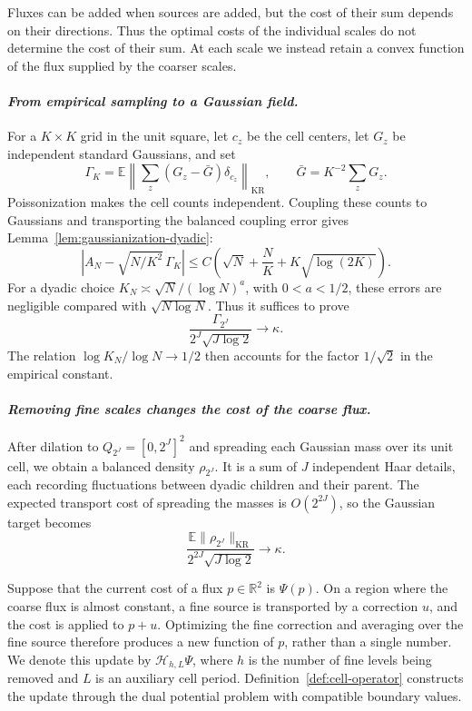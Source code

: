 \documentclass[11pt,reqno]{amsart}
\theoremstyle{plain}
\theoremstyle{definition}
\theoremstyle{remark}
\numberwithin{equation}{section}
\newcommand{\1}{\mathbf 1}
\newcommand{\KR}{\mathrm{KR}}
\begin{document}
Fluxes can be added when sources are added, but the cost of their sum
depends on their directions.  Thus the optimal costs of the individual
scales do not determine the cost of their sum.  At each scale we instead
retain a convex function of the flux supplied by the coarser scales.

\smallskip
\paragraph{\textit{From empirical sampling to a Gaussian field.}}
For a $K\times K$ grid in the unit square, let $c_z$ be the cell centers,
let $G_z$ be independent standard Gaussians, and set
\[
\Gamma_K=\mathbb E\left\|
\sum_z(G_z-\bar G)\delta_{c_z}\right\|_{\KR},
\qquad \bar G=K^{-2}\sum_zG_z.
\]
Poissonization makes the cell counts independent.  Coupling these counts
to Gaussians and transporting the balanced coupling error gives
Lemma~\ref{lem:gaussianization-dyadic}:
\[
\left|A_N-\sqrt{N/K^2}\,\Gamma_K\right|
\leq C\left(\sqrt N+\frac NK+K\sqrt{\log(2K)}\right).
\]
For a dyadic choice $K_N\asymp\sqrt N/(\log N)^a$, with $0<a<1/2$,
these errors are negligible compared with $\sqrt{N\log N}$.
Thus it suffices to prove
\begin{equation}
\frac{\Gamma_{2^J}}{2^J\sqrt{J\log2}}\longrightarrow\kappa.
\tag{R}\label{eq:roadmap-gaussian-target}
\end{equation}
The relation $\log K_N/\log N\to1/2$ then accounts for the factor
$1/\sqrt2$ in the empirical constant.

\smallskip
\paragraph{\textit{Removing fine scales changes the cost of the coarse flux.}}
After dilation to $Q_{2^J}=[0,2^J]^2$ and spreading each Gaussian mass
over its unit cell, we obtain a balanced density $\rho_{2^J}$.
It is a sum of $J$ independent Haar details, each recording fluctuations
between dyadic children and their parent.  The expected transport cost
of spreading the masses is $O(2^{2J})$, so the Gaussian target becomes
\[
\frac{\mathbb E\|\rho_{2^J}\|_{\KR}}{2^{2J}\sqrt{J\log2}}
\longrightarrow\kappa.
\]

Suppose that the current cost of a flux $p\in\mathbb R^2$ is $\Psi(p)$.
On a region where the coarse flux is almost constant, a fine source is
transported by a correction $u$, and the cost is applied to $p+u$.
Optimizing the fine correction and averaging over the fine source
therefore produces a new function of $p$, rather than a single number.
We denote this update by $\mathcal H_{h,L}\Psi$, where $h$ is the number
of fine levels being removed and $L$ is an auxiliary cell period.
Definition~\ref{def:cell-operator} constructs the update through the dual
potential problem with compatible boundary values.
\end{document}
